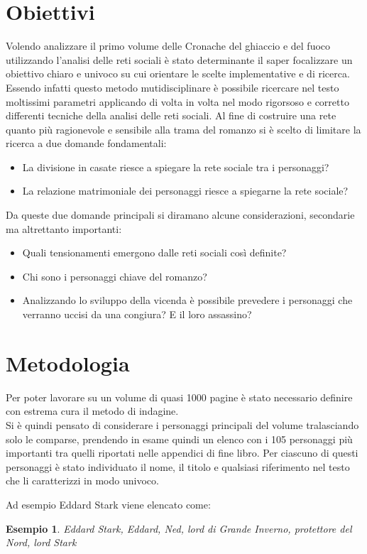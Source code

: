 \documentclass[a4paper]{article}
\begin{document}
\section{Obiettivi}

Volendo analizzare il primo volume delle Cronache del ghiaccio e del fuoco utilizzando l'analisi delle reti sociali è stato determinante il saper focalizzare un obiettivo chiaro e univoco su cui orientare le scelte implementative e di ricerca.
Essendo infatti questo metodo mutidisciplinare è possibile ricercare nel testo moltissimi parametri applicando di volta in volta nel modo rigorsoso e corretto differenti tecniche della analisi delle reti sociali. Al fine di costruire una rete quanto più ragionevole e sensibile alla trama del romanzo si è scelto di limitare la ricerca a due domande fondamentali:

\begin{itemize}
\item La divisione in casate riesce a spiegare la rete sociale tra i personaggi?
\item La relazione matrimoniale dei personaggi riesce a spiegarne la rete sociale?
\end{itemize}
Da queste due domande principali si diramano alcune considerazioni, secondarie ma altrettanto importanti:

\begin{itemize}
\item Quali tensionamenti emergono dalle reti sociali così definite?
\item Chi sono i personaggi chiave del romanzo?
\item Analizzando lo sviluppo della vicenda è possibile prevedere i personaggi che verranno uccisi da una congiura? E il loro assassino?
\end{itemize}

\section{Metodologia}

Per poter lavorare su un volume di quasi 1000 pagine è stato necessario definire con estrema cura il metodo di indagine.\\
Si è quindi pensato di considerare i personaggi principali del volume tralasciando solo le comparse, prendendo in esame quindi un elenco con i 105 personaggi più importanti tra quelli riportati nelle appendici di fine libro. Per ciascuno di questi personaggi è stato individuato il nome, il titolo e qualsiasi riferimento nel testo che li caratterizzi in modo univoco.\\
\newtheorem{xxx}{Esempio}
Ad esempio Eddard Stark viene elencato come:
\begin{xxx}
Eddard Stark, Eddard, Ned, lord di Grande Inverno, protettore del Nord, lord Stark
\end{xxx}
\end{document}
